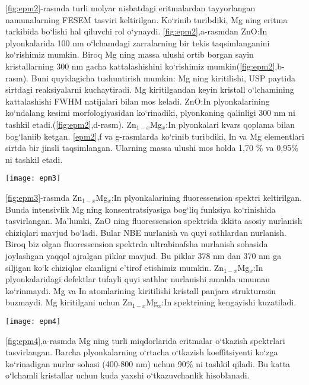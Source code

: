 \documentclass[14pt]{article}
\begin{document}
\ref{fig:epm2}-rasmda turli molyar nisbatdagi eritmalardan tayyorlangan namunalarning FESEM tasviri keltirilgan. Ko`rinib turibdiki, Mg ning eritma tarkibida bo`lishi hal qiluvchi rol o`ynaydi. 
\ref{fig:epm2},a-rasmdan ZnO:In plyonkalarida 100 nm o`lchamdagi zarralarning bir tekis taqsimlanganini ko`rishimiz mumkin. Biroq Mg ning massa ulushi ortib borgan sayin kristallarning 300 nm gacha kattalashishini ko`rishimiz mumkin(\ref{fig:epm2},b-rasm). 
Buni quyidagicha tushuntirish mumkin: Mg ning kiritilishi, USP paytida sirtdagi reaksiyalarni kuchaytiradi. Mg kiritilgandan keyin kristall o`lchamining kattalashishi FWHM natijalari bilan mos keladi. ZnO:In plyonkalarining ko`ndalang kesimi morfologiyasidan ko`rinadiki, plyonkaning qalinligi 300 nm ni tashkil etadi.(\ref{fig:epm2},d-rasm). Zn$_{1-x}$Mg$_{x}$:In plyonkalari kvars qoplama bilan bog`laniib ketgan. \ref{epm2},f va g-rasmlarda ko`rinib turibdiki, In va Mg elementlari sirtda bir jinsli taqsimlangan. Ularning massa ulushi mos holda 1,70 \% va 0,95\% ni tashkil etadi. 
	
\begin{figure*}[h]
	\centering
	\texttt{[image: epm3]}
	\caption{Zn$_{1-x}$Mg$_{x}$:In plyonkalarining fotolyuminessension spektri}
	\label{fig:epm3}
\end{figure*}
	\ref{fig:epm3}-rasmda Zn$_{1-x}$Mg$_{x}$:In plyonkalarining fluoressension spektri keltirilgan. Bunda intensivlik Mg ning konsentratsiyasiga bog`liq funksiya ko`rinishida tasvirlangan. Ma'lumki, ZnO ning fluoressension spektrida ikkita asosiy nurlanish chiziqlari mavjud bo`ladi. Bular NBE nurlanish va quyi sathlardan nurlanish. Biroq biz olgan fluoressension spektrda ultrabinafsha nurlanish sohasida joylashgan yaqqol ajralgan piklar mavjud. Bu piklar 378 nm dan 370 nm ga siljigan ko`k chiziqlar ekanligni e'tirof etishimiz mumkin. Zn$_{1-x}$Mg$_{x}$:In plyonkalaridagi defektlar tufayli quyi sathlar nurlanishi amalda umuman ko`rinmaydi. Mg va In atomlarining kiritilishi kristall panjara strukturasin buzmaydi. Mg kiritilgani uchun Zn$_{1-x}$Mg$_{x}$:In spektrining kengayishi kuzatiladi.
	
\begin{figure*}[h]
	\centering
	\texttt{[image: epm4]}
	\caption{Mg ning turli konsentratsiyalarida yupqa plyonkalarning o`tkazish spektri(a) va $\alpha$ qiymat va foto energiya orasidagi korrelyatsiya}
	\label{fig:epm4}
\end{figure*}
	\ref{fig:epm4},a-rasmda Mg ning turli miqdorlarida eritmalar o`tkazish spektrlari tasvirlangan. Barcha plyonkalarning o`rtacha o`tkazish koeffitsiyenti ko`zga ko`rinadigan nurlar sohasi (400-800 nm) uchun 90\% ni tashkil qiladi. Bu katta o`lchamli kristallar uchun kuda yaxshi o`tkazuvchanlik hisoblanadi.
	
\end{document}
